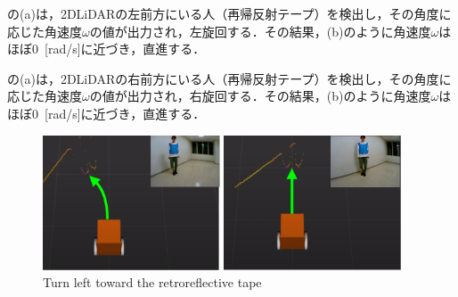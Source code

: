   の(a)は，2DLiDARの左前方にいる人（再帰反射テープ）を検出し，その角度に応じた角速度$\omega$の値が出力され，左旋回する．その結果，(b)のように角速度$\omega$はほぼ0 \,[rad/s]に近づき，直進する．

  の(a)は，2DLiDARの右前方にいる人（再帰反射テープ）を検出し，その角度に応じた角速度$\omega$の値が出力され，右旋回する．その結果，(b)のように角速度$\omega$はほぼ0 \,[rad/s]に近づき，直進する．

\begin{figure}[h]
  \centering
  \begin{minipage}[c]{65mm} 
      \centering
      \includegraphics[height=40mm]{images/RobotGuidance_learning_turn_left_(a).png}
  \end{minipage}
  \begin{minipage}[c]{65mm} 
      \centering
      \includegraphics[height=40mm]{images/RobotGuidance_learning_turn_left_(b).png}
  \end{minipage}
  \caption{Turn left toward the retroreflective tape}
  \label{Fig:RobotGuidance_learning_turn_left}
\end{figure}

